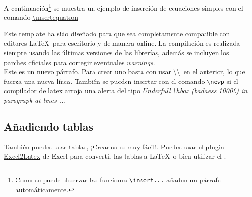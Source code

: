 
	A continuación\footnote{Como se puede observar las funciones \texttt{\textbackslash insert...} añaden un párrafo automáticamente.} se muestra un ejemplo de inserción de ecuaciones simples con el comando \href{https://template-latex.github.io/informe.html#hlp-formulae}{\textbackslash insertequation}:


	Este template \cite{template} ha sido diseñado para que sea completamente compatible con editores \LaTeX\ para escritorio y de manera online. La compilación es realizada siempre usando las últimas versiones de las librerías, además se incluyen los parches oficiales para corregir eventuales \textit{warnings}. \\

	Este es un nuevo párrafo. Para crear uno basta con usar \textbackslash\textbackslash\ en el anterior, lo que fuerza una nueva línea. También se pueden insertar con el comando \texttt{\textbackslash newp} si el compilador de latex arroja una alerta del tipo \textit{Underfull \textbackslash hbox (badness 10000) in paragraph at lines ...}

\subsection{Añadiendo tablas}

	También puedes usar tablas, ¡Crearlas es muy fácil!. Puedes usar el plugin \href{https://www.ctan.org/tex-archive/support/excel2latex}{Excel2Latex} \cite{excel2latex} de Excel para convertir las tablas a \LaTeX\ o bien utilizar el  \cite{tablesgenerator}.

